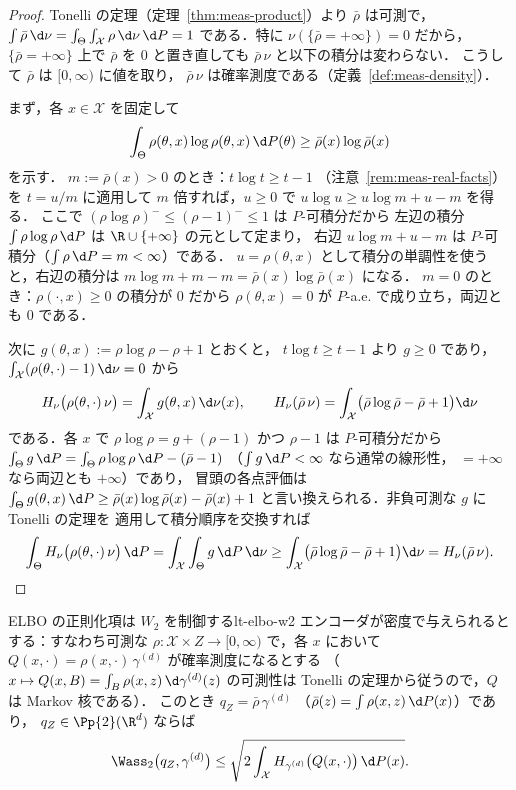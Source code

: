 \begin{proof}
  Tonelli の定理（定理~\ref{thm:meas-product}）より
  $\bar\rho$ は可測で，
  $\int\bar\rho\,\d\nu=\int_\Theta\int_{\mathcal{X}}\rho\,\d\nu\,\d P=1$
  である．特に $\nu(\{\bar\rho=+\infty\})=0$ だから，
  $\{\bar\rho=+\infty\}$ 上で $\bar\rho$ を $0$ と置き直しても
  $\bar\rho\,\nu$ と以下の積分は変わらない．
  こうして $\bar\rho$ は $[0,\infty)$ に値を取り，
  $\bar\rho\,\nu$ は確率測度である（定義~\ref{def:meas-density}）．

  まず，各 $x\in\mathcal{X}$ を固定して
  \[
    \int_\Theta\rho(\theta,x)\log\rho(\theta,x)\,\d P(\theta)
    \geq\bar\rho(x)\log\bar\rho(x)
  \]
  を示す．
  $m:=\bar\rho(x)>0$ のとき：$t\log t\geq t-1$
  （注意~\ref{rem:meas-real-facts}）を $t=u/m$ に適用して
  $m$ 倍すれば，$u\geq0$ で
  $u\log u\geq u\log m+u-m$ を得る．
  ここで $(\rho\log\rho)^-\leq(\rho-1)^-\leq1$ は $P$-可積分だから
  左辺の積分 $\int\rho\log\rho\,\d P$ は
  $\R\cup\{+\infty\}$ の元として定まり，
  右辺 $u\log m+u-m$ は $P$-可積分（$\int\rho\,\d P=m<\infty$）である．
  $u=\rho(\theta,x)$ として積分の単調性を使うと，右辺の積分は
  $m\log m+m-m=\bar\rho(x)\log\bar\rho(x)$ になる．
  $m=0$ のとき：$\rho(\cdot,x)\geq0$ の積分が $0$ だから
  $\rho(\theta,x)=0$ が $P$-a.e. で成り立ち，両辺とも $0$ である．

  次に $g(\theta,x):=\rho\log\rho-\rho+1$ とおくと，
  $t\log t\geq t-1$ より $g\geq0$ であり，
  $\int_{\mathcal{X}}(\rho(\theta,\cdot)-1)\,\d\nu=0$ から
  \[
    H_\nu\bigl(\rho(\theta,\cdot)\,\nu\bigr)
    =\int_{\mathcal{X}}g(\theta,x)\,\d\nu(x),
    \qquad
    H_\nu(\bar\rho\,\nu)
    =\int_{\mathcal{X}}\bigl(\bar\rho\log\bar\rho-\bar\rho+1\bigr)\d\nu
  \]
  である．各 $x$ で $\rho\log\rho=g+(\rho-1)$ かつ
  $\rho-1$ は $P$-可積分だから
  $\int_\Theta g\,\d P=\int_\Theta\rho\log\rho\,\d P
  -(\bar\rho-1)$
  （$\int g\,\d P<\infty$ なら通常の線形性，
  $=+\infty$ なら両辺とも $+\infty$）であり，
  冒頭の各点評価は
  $\int_\Theta g(\theta,x)\,\d P
  \geq\bar\rho(x)\log\bar\rho(x)-\bar\rho(x)+1$
  と言い換えられる．非負可測な $g$ に Tonelli の定理を
  適用して積分順序を交換すれば
  \[
    \int_\Theta H_\nu\bigl(\rho(\theta,\cdot)\,\nu\bigr)\,\d P
    =\int_{\mathcal{X}}\int_\Theta g\,\d P\,\d\nu
    \geq\int_{\mathcal{X}}\bigl(\bar\rho\log\bar\rho-\bar\rho+1\bigr)\d\nu
    =H_\nu(\bar\rho\,\nu).  \qedhere
  \]
\end{proof}

\begin{corollary}{ELBO の正則化項は $W_2$ を制御する}{lt-elbo-w2}
  エンコーダが密度で与えられるとする：すなわち可測な
  $\rho\colon\mathcal{X}\times Z\to[0,\infty)$ で，各 $x$ において
  $Q(x,\cdot)=\rho(x,\cdot)\,\gamma^{(d)}$ が確率測度になるとする
  （$x\mapsto Q(x,B)=\int_B\rho(x,z)\,\d\gamma^{(d)}(z)$ の可測性は
  Tonelli の定理から従うので，$Q$ は Markov 核である）．
  このとき $q_Z=\bar\rho\,\gamma^{(d)}$
  （$\bar\rho(z)=\int\rho(x,z)\,\d P(x)$）であり，
  $q_Z\in\Pp{2}(\R^d)$ ならば
  \[
    \Wass_2\bigl(q_Z,\gamma^{(d)}\bigr)
    \leq\sqrt{2\int_{\mathcal{X}}
    H_{\gamma^{(d)}}\bigl(Q(x,\cdot)\bigr)\,\d P(x)}.
  \]
\end{corollary}

